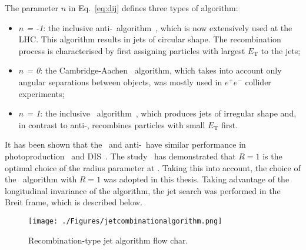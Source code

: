 The parameter $n$ in Eq.~\eqref{eq:dij} defines three types of algorithm:
\begin{itemize}
	\item \textsl{$n$ = -1}: the inclusive anti-\kt~algorithm~\cite{Cacciari:2008gp}, which is now extensively used at the LHC. This algorithm results in jets of circular shape. The recombination process is characterised by first assigning particles with largest $E_\text{T}$ to the jets;
	\item \textsl{$n$ = 0}: the Cambridge-Aachen~\cite{Dokshitzer:1997in} algorithm, which takes into account only angular separations between objects, was mostly used in $e^+e^-$ collider experiments;
	\item \textsl{$n$ = 1}: the inclusive \kt~algorithm~\cite{Catani:1993hr}, which produces jets of irregular shape and, in contrast to anti-\kt, recombines particles with small $E_\text{T}$ first.
\end{itemize}
 It has been shown that the \kt~and anti-\kt~have similar performance in photoproduction~\cite{np:b864:1} and DIS~\cite{Abramowicz:2010ke}. The study~\cite{pl:b649:12} has demonstrated that $R=1$ is the optimal choice of the radius parameter at \hera. Taking this into account, the choice of the \kt~algorithm with $R=1$ was adopted in this thesis. Taking advantage of the longitudinal invariance of the algorithm, the jet search was performed in the Breit frame, which is described below.

\begin{figure}
	\centering
		\texttt{[image: ./Figures/jetcombinationalgorithm.png]}
	\caption{Recombination-type jet algorithm flow char.}
	\label{fig:jetcombinationalgorithm}
\end{figure}
